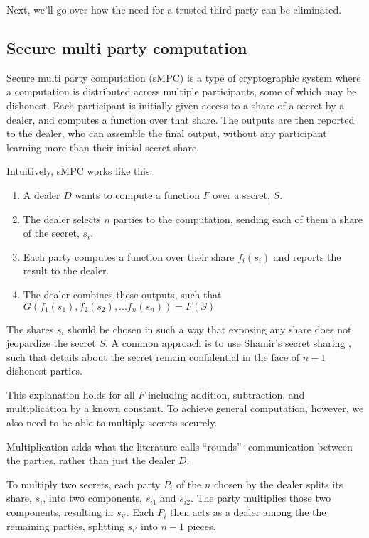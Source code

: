 \documentclass[11pt]{article}
\begin{document}
Next, we'll go over how the need for a trusted third party can be
eliminated.

\subsection{Secure multi party computation}

Secure multi party computation (sMPC) is a type of cryptographic
system where a computation is distributed across multiple
participants, some of which may be dishonest. Each participant is
initially given access to a share of a secret by a dealer, and
computes a function over that share. The outputs are then reported to
the dealer, who can assemble the final output, without any participant
learning more than their initial secret share.

Intuitively, sMPC works like this.

\begin{enumerate}
  \item A dealer $D$ wants to compute a function $F$ over a secret,
      $S$.
  \item The dealer selects $n$ parties to the computation, sending
      each of them a share of the secret, $s_i$.
  \item Each party computes a function over their share $f_i(s_i)$ and
      reports the result to the dealer.
  \item The dealer combines these outputs, such that
      $G(f_1(s_1),f_2(s_2),...f_n(s_n)) = F(S)$
\end{enumerate}

The shares $s_i$ should be chosen in such a way that exposing any
share does not jeopardize the secret $S$. A common approach is to use
Shamir's secret sharing \cite{shamir}, such that details about the
secret remain confidential in the face of $n-1$ dishonest parties.

This explanation holds for all $F$ including addition, subtraction,
and multiplication by a known constant. To achieve general
computation, however, we also need to be able to multiply secrets
securely.

Multiplication adds what the literature calls ``rounds''- communication
between the parties, rather than just the dealer $D$.

To multiply two secrets, each party $P_i$ of the $n$ chosen by the
dealer splits its share, $s_i$, into two components, $s_{i1}$ and
$s_{i2}$. The party multiplies those two components, resulting in
$s_{i'}$. Each $P_i$ then acts as a dealer among the the remaining
parties, splitting $s_{i'}$ into $n-1$ pieces.
\end{document}
